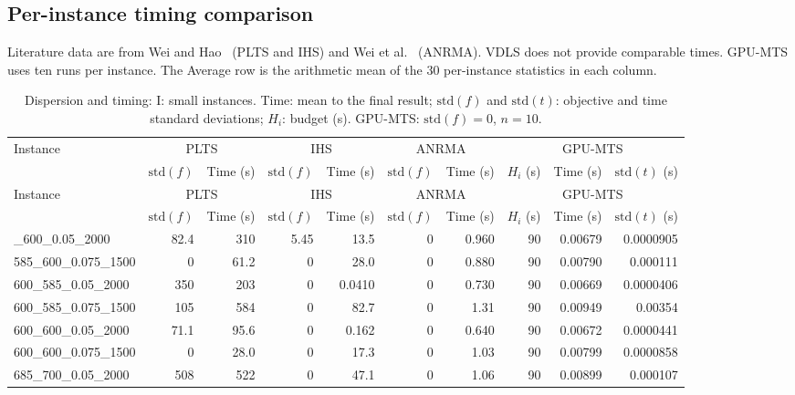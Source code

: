 \begin{landscape}
\section{{Per-instance timing comparison}}
\label{app:full-times}
{Literature data are from Wei and Hao~\cite{Wei2023IHS} (PLTS and IHS) and Wei et al.~\cite{Wei2026ANRMA} (ANRMA). VDLS does not provide comparable times. GPU-MTS uses ten runs per instance. The Average row is the arithmetic mean of the 30 per-instance statistics in each column.}

\fontsize{9}{10.5}\selectfont\setlength{\tabcolsep}{4pt}\renewcommand{\arraystretch}{.88}
\begin{longtable}{lrrrrrrrrr}
\caption{Dispersion and timing: I: small instances. Time: mean to the final result; $\mathrm{std}(f)$ and $\mathrm{std}(t)$: objective and time standard deviations; $H_i$: budget (s). GPU-MTS: $\mathrm{std}(f)=0$, $n=10$.}\\
\toprule
Instance & \multicolumn{2}{c}{PLTS} & \multicolumn{2}{c}{IHS} & \multicolumn{2}{c}{ANRMA} & \multicolumn{3}{c}{GPU-MTS}\\
 & $\mathrm{std}(f)$ & Time (s) & $\mathrm{std}(f)$ & Time (s) & $\mathrm{std}(f)$ & Time (s) & $H_i$ (s) & Time (s) & $\mathrm{std}(t)$ (s)\\
\midrule\endfirsthead
Instance & \multicolumn{2}{c}{PLTS} & \multicolumn{2}{c}{IHS} & \multicolumn{2}{c}{ANRMA} & \multicolumn{3}{c}{GPU-MTS}\\
 & $\mathrm{std}(f)$ & Time (s) & $\mathrm{std}(f)$ & Time (s) & $\mathrm{std}(f)$ & Time (s) & $H_i$ (s) & Time (s) & $\mathrm{std}(t)$ (s)\\
\midrule\endhead
\bottomrule\endlastfoot
585\_600\_0.05\_2000 & 82.4 & 310 & 5.45 & 13.5 & 0 & 0.960 & 90 & 0.00679 & 0.0000905\\
585\_600\_0.075\_1500 & 0 & 61.2 & 0 & 28.0 & 0 & 0.880 & 90 & 0.00790 & 0.000111\\
600\_585\_0.05\_2000 & 350 & 203 & 0 & 0.0410 & 0 & 0.730 & 90 & 0.00669 & 0.0000406\\
600\_585\_0.075\_1500 & 105 & 584 & 0 & 82.7 & 0 & 1.31 & 90 & 0.00949 & 0.00354\\
600\_600\_0.05\_2000 & 71.1 & 95.6 & 0 & 0.162 & 0 & 0.640 & 90 & 0.00672 & 0.0000441\\
600\_600\_0.075\_1500 & 0 & 28.0 & 0 & 17.3 & 0 & 1.03 & 90 & 0.00799 & 0.0000858\\
685\_700\_0.05\_2000 & 508 & 522 & 0 & 47.1 & 0 & 1.06 & 90 & 0.00899 & 0.000107\\

\end{longtable}
\end{landscape}
